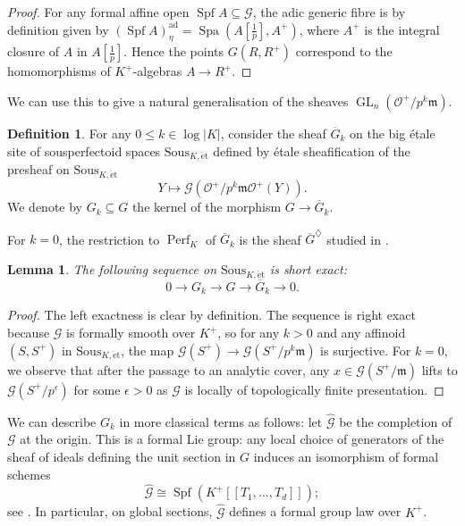 \documentclass[10pt,a4paper]{article}
\newtheorem{Lemma}[thm]{Lemma}
\theoremstyle{definition}
\newtheorem{Definition}[thm]{Definition}
\theoremstyle{remark}
\newcommand{\lra}{\longrightarrow}
\newcommand{\wh}{\widehat}
\renewcommand{\O}{\mathcal{O}}
\newcommand{\m}{\mathfrak{m}}
\newcommand{\GL}{\operatorname{GL}}
\newcommand{\Perf}{\operatorname{Perf}}
\newcommand{\Spa}{\operatorname{Spa}}
\newcommand{\et}{{\operatorname{\acute{e}t}}}
\newcommand{\tf}{[\tfrac{1}{p}]}
\newcommand{\ad}{\mathrm{ad}}
\newcommand{\Spf}{\operatorname{Spf}}
\newcommand{\mG}{\mathcal{G}}
\newcommand{\Sous}{\mathrm{Sous}}
\numberwithin{equation}{section}
\begin{document}
\begin{proof}
	For any formal affine open $\Spf A\subseteq \mG$, the adic generic fibre is by definition given by $(\Spf A)^{\ad}_{\eta}=\Spa(A\tf,A^+)$, where $A^+$ is the integral closure of $A$ in $A\tf$. Hence the points $G(R,R^+)$ correspond to the homomorphisms of $K^+$-algebras $A\to R^+$.
\end{proof}

We can use this to give a natural generalisation of the sheaves $\GL_n(\O^+/p^k\m)$. 

\begin{Definition}
	For any $0\leq k\in \log|K|$, consider the  sheaf $\overline G_{k}$ on the big \'etale site of sousperfectoid spaces $\mathrm{Sous}_{K,\et}$ defined by \'etale sheafification of the presheaf on $\Sous_{K,\et}$
		\[ Y\longmapsto \mG\left(\O^+/p^k\m\O^+(Y)\right).\]
	We denote by $G_{k}\subseteq G$ the kernel of the morphism $G\to \overline G_{k}$.
\end{Definition}

For $k=0$, the restriction to $\Perf_K$  of $\overline G_{k}$ is the sheaf $\overline G^\diamondsuit$ studied in \cite[Section~5]{heuer-Picard-good-reduction}. 

\begin{Lemma}\label{l:ses-of-G_k}
	The following sequence on $\Sous_{K,\et}$ is short exact:
	\[ 0\lra G_k\lra G\lra \overline G_{k}\lra 0.\]
\end{Lemma}

\begin{proof}
	The left exactness is clear by definition. The sequence is right exact because $\mG$ is formally smooth over $K^+$, so for any $k>0$ and any affinoid $(S,S^+)$ in $\Sous_{K,\et}$, the map $\mG(S^+ )\to \mG(S^+/p^k\m)$ is surjective. For $k=0$, we observe that after the passage to an analytic cover, any $x\in \mG(S^+/\m)$ lifts to $\mG(S^+/p^{\epsilon})$ for some $\epsilon>0$ as $\mG$ is locally of topologically finite presentation.
\end{proof}

We can describe $G_k$ in more classical terms as follows: let $\wh{\mathcal G}$ be the completion of $\mathcal G$ at the origin. This is a formal Lie group: any local choice of generators of the sheaf of ideals defining the unit section in $G$ induces an isomorphism of formal schemes
\[\wh{\mathcal G}\cong \Spf(K^+[[T_1,\dots,T_d]]);\]
see \cite[Chapter II,  pp.~25--26]{MessingCrystals}. 
In particular, on global sections, $\wh{\mathcal G}$ defines a formal group law over $K^+$.
\end{document}
